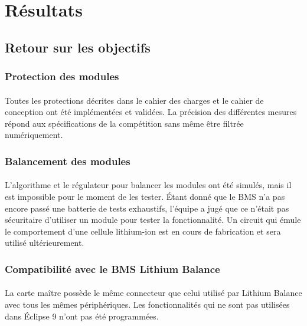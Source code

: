 \section{Résultats}

	\subsection{Retour sur les objectifs}
	
		\subsubsection{Protection des modules}
	
			\paragraph{}
			Toutes les protections décrites dans le cahier des charges et le cahier de conception ont été implémentées et validées. La précision des différentes mesures répond aux spécifications de la compétition sans même être filtrée numériquement.

		\subsubsection{Balancement des modules}

			\paragraph{}
			L'algorithme et le régulateur pour balancer les modules ont été simulés, mais il est impossible pour le moment de les tester. Étant donné que le BMS n'a pas encore passé une batterie de tests exhaustifs, l'équipe a jugé que ce n'était pas sécuritaire d'utiliser un module pour tester la fonctionnalité. Un circuit qui émule le comportement d'une cellule lithium-ion est en cours de fabrication et sera utilisé ultérieurement.
	
		\subsubsection{Compatibilité avec le BMS Lithium Balance}
	
			\paragraph{}
			La carte maître possède le même connecteur que celui utilisé par Lithium Balance avec tous les mêmes périphériques. Les fonctionnalités qui ne sont pas utilisées dans Éclipse 9 n'ont pas été programmées.
		
